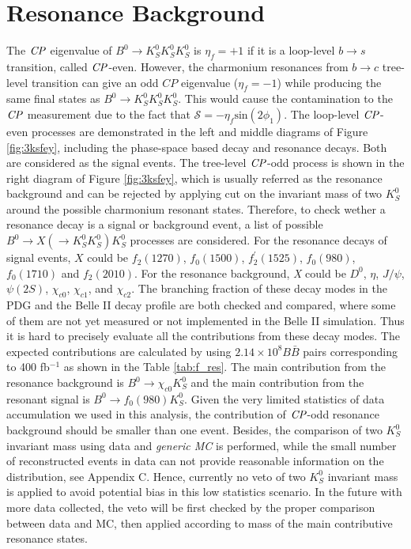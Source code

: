 \section{Resonance Background}

The $\it{CP}$ eigenvalue of $B^0 \to K_S^0  K_S^0  K_S^0$ is $\eta_f = +1$ if it is a loop-level $b\to s$ transition, called $\it{CP}$-even. However, the charmonium resonances from $b \to c$ tree-level transition can give an odd $\textit{CP}$ eigenvalue ($\eta_f = -1$) while producing the same final states as $B^0 \to K_S^0  K_S^0  K_S^0$.  This would cause the contamination to the $\it{CP}$ measurement due to the fact that $\mathcal{S} = -\eta_f\text{sin}(2\phi_1)$. The loop-level $\it{CP}$-even processes are demonstrated in the left and middle diagrams of Figure \ref{fig:3ksfey}, including the phase-space based decay and resonance decays. Both are considered as the signal events. The tree-level $\it{CP}$-odd process is shown in the right diagram of Figure \ref{fig:3ksfey}, which is usually referred as the resonance background and can be rejected by applying cut on the invariant mass of two $K_S^0$ around the possible charmonium resonant states. Therefore, to check wether a resonance decay is a signal or background event, a list of possible $B^0 \to X(\to K^0_S K^0_S) K^0_S$ processes are considered. For the resonance decays of signal events, $X$ could be $f_2(1270)$, $f_0(1500)$, $f_{2}^{'}(1525)$, $f_0(980)$, $f_0(1710)$ and $f_2(2010)$. For the resonance background, \textit{X} could be $D^0$, $\eta$, $J/\psi$, $\psi(2S)$,  $\chi_{c0}$, $\chi_{c1}$, and $\chi_{c2}$.
The branching fraction of these decay modes in the PDG and the Belle II decay profile are both checked and compared, where some of them are not yet measured or not implemented in the Belle II simulation. Thus it is hard to precisely evaluate all the contributions from these decay modes. The expected contributions are calculated by using $2.14\times 10^8 B\bar{B}$ pairs corresponding to 400 fb$^{-1}$ as shown in the Table \ref{tab:f_res}. The main contribution from the resonance background is $B^0\to \chi_{c0} K^0_S$ and the main contribution from the resonant signal is $B^0\to f_0(980)K^0_S$. Given the very limited statistics of data accumulation we used in this analysis, the contribution of $\it{CP}$-odd resonance background should be smaller than one event. Besides, the comparison of two $K_S^0$ invariant mass using data and \textit{generic MC} is performed, while the small number of reconstructed events in data can not provide reasonable information on the distribution, see Appendix C. Hence, currently no veto of two $K_S^0$ invariant mass is applied to avoid potential bias in this low statistics scenario. In the future with more data collected, the veto will be first checked by the proper comparison between data and MC, then applied according to mass of the main contributive resonance states.
